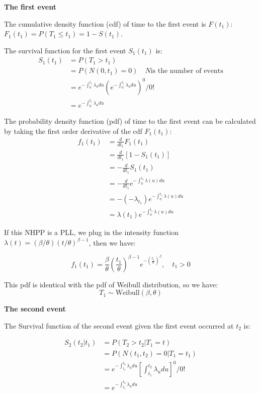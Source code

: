 \documentclass[12pt]{book}
\numberwithin{equation}{chapter}
\begin{document}
\textbf{The first event}

The cumulative density function (cdf) of time to the first event is \(F(t_1)\): \(F_1(t_1) = P(T_1 \leq t_1) = 1 - S(t_1)\).

The survival function for the first event \(S_1(t_1)\) is:
\begin{align*}
S_1(t_1) & = P(T_1 > t_1) \\
 & = P(N(0, t_1) = 0) \quad N \text{is the number of events}\\
 & = e^{-\int_{0}^{t_1}\lambda_{u}du}(e^{-\int_{0}^{t_1}\lambda_{u}du})^0/0!\\
 & = e^{-\int_{0}^{t_1}\lambda_{u}du}
\end{align*}

The probability density function (pdf) of time to the first event can be calculated by taking the first order derivative of the cdf \(F_1(t_1)\):
\begin{align*}
f_1(t_1) & = \frac{d}{dt_1}F_1(t_1)\\
& = \frac{d}{dt_1}[1 - S_1(t_1)] \\
& = - \frac{d}{dt_1}S_1(t_1)\\
& = - \frac{d}{dt_1}e^{-\int_{0}^{t_1}\lambda (u)du}\\
& = -(-\lambda_{t_1})e^{-\int_{0}^{t_1}\lambda (u)du}\\
& = \lambda (t_1)e^{-\int_{0}^{t_1}\lambda (u)du}
\end{align*}

If this NHPP is a PLL, we plug in the intensity function \(\lambda(t) = (\beta / \theta)(t/\theta)^{\beta - 1}\), then we have:

\[f_1(t_1) = \frac{\beta}{\theta}(\frac{t_1}{\theta})^{\beta - 1}e^{-(\frac{t_1}{\theta})^\beta}, \quad t_1 > 0\]

This pdf is identical with the pdf of Weibull distribution, so we have:
\[T_1 \sim \text{Weibull}(\beta, \theta)\]

\textbf{The second event}

The Survival function of the second event given the first event occurred at \(t_2\) is:

\begin{align*}
S_2(t_2 | t_1) & = P(T_2 > t_2 | T_1 = t)\\
& = P(N(t_1, t_2) = 0|T_1 = t_1) \\
& = e^{-\int_{t_1}^{t_2}\lambda_{u}du}[\int_{t_1}^{t_2}\lambda_{u}du]^0/0!\\
& = e^{-\int_{t_1}^{t_2}\lambda_{u}du}
\end{align*}
\end{document}
